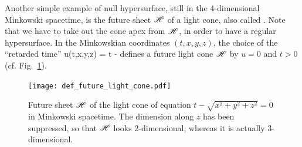 \begin{example} \label{x:def:light_cone}
Another simple example of null hypersurface, still in the 4-dimensional Minkowski spacetime,
is the future sheet $\mathscr{H}$ of a light cone, also
called . Note that we have
to take out the cone apex from $\mathscr{H}$, in order to have a regular hypersurface.
In the  Minkowskian coordinates $(t,x,y,z)$, the choice of the
``retarded time''
\be \label{e:def:light_cone_u}
    u(t,x,y,z) = t - 
\ee
defines a future light cone $\mathscr{H}$ by $u=0$ and $t>0$ (cf.
Fig.~\ref{f:def:future_light_cone}).
\end{example}

\begin{figure}
\centerline{\texttt{[image: def\_future\_light\_cone.pdf]}}
\caption[]{\label{f:def:future_light_cone} \footnotesize
Future sheet $\mathscr{H}$ of the light cone of equation $t-\sqrt{x^2+y^2+z^2}=0$ in Minkowski spacetime.
The dimension along $z$ has been suppressed, so that $\mathscr{H}$ looks 2-dimensional,
whereas it is actually 3-dimensional.}
\end{figure}


